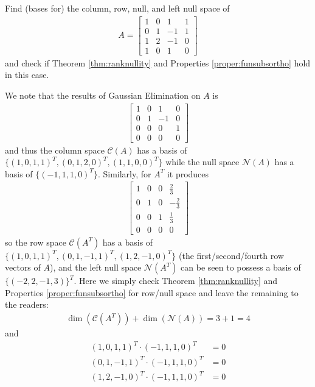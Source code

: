 \begin{Exercise}
Find (bases for) the column, row, null, and left null space of 
\begin{align*}
A = 
\begin{bmatrix}
1 & 0 & 1 & 1 \\
0 & 1 & -1 & 1 \\
1 & 2 & -1 & 0 \\
1 & 0 & 1 & 0
\end{bmatrix}
\end{align*}
and check if Theorem \ref{thm:ranknullity} and Properties \ref{proper:funsubsortho} hold in this case.
\end{Exercise}
\begin{Answer}
We note that the results of Gaussian Elimination on $A$ is
\begin{align*}
\begin{bmatrix}
1&0&1&0\\ 
0&1&-1&0\\ 
0&0&0&1\\ 
0&0&0&0
\end{bmatrix}    
\end{align*}
and thus the column space $\mathcal{C}(A)$ has a basis of $\{(1,0,1,1)^T, (0,1,2,0)^T, \allowbreak (1,1,0,0)^T\}$ while the null space $\mathcal{N}(A)$ has a basis of $\{(-1,1,1,0)^T\}$. Similarly, for $A^T$ it produces
\begin{align*}
\begin{bmatrix}
1&0&0&\frac{2}{3}\\ 
0&1&0&-\frac{2}{3}\\ 
0&0&1&\frac{1}{3}\\ 
0&0&0&0
\end{bmatrix}
\end{align*}
so the row space $\mathcal{C}(A^T)$ has a basis of $\{(1,0,1,1)^T, (0,1,-1,1)^T, (1,2,-1,0)^T\}$ (the first/second/fourth row vectors of $A$), and the left null space $\mathcal{N}(A^T)$ can be seen to possess a basis of $\{(-2,2,-1,3)\}^T$. Here we simply check Theorem \ref{thm:ranknullity} and Properties \ref{proper:funsubsortho} for row/null space and leave the remaining to the readers:
\begin{align*}
\dim(\mathcal{C}(A^T)) + \dim(\mathcal{N}(A)) = 3 + 1 = 4
\end{align*}
and
\begin{align*}
(1,0,1,1)^T \cdot (-1,1,1,0)^T &= 0 \\
(0,1,-1,1)^T \cdot (-1,1,1,0)^T &= 0 \\
(1,2,-1,0)^T \cdot (-1,1,1,0)^T &= 0 
\end{align*}
\end{Answer}